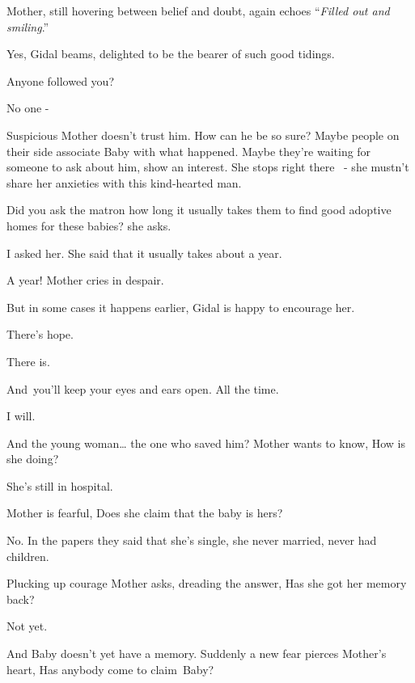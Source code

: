 \documentclass[letterpaper]{article}
\begin{document}
Mother, still hovering between belief and doubt, again{ }echoes ``\textit{Filled
out and smiling}.'' 

{\textquotedbl}Yes,{\textquotedbl} Gidal beams, delighted to be the bearer of such good tidings. 

{\textquotedbl}Anyone followed you?{\textquotedbl} 

{\textquotedbl}No one -{\textquotedbl} 

Suspicious{ }Mother doesn't trust him. How can he be so sure? Maybe people on
their side associate Baby with what happened. Maybe they're waiting for someone to ask about him, show an interest. She
stops right there \ {}- she mustn't share her anxieties with this kind-hearted man. 

{\textquotedbl}Did you ask the matron how long it usually takes them to find good adoptive homes for these
babies?{\textquotedbl} she asks.

{\textquotedbl}I asked her. She said that it usually takes about a year.{\textquotedbl} 

{\textquotedbl}A year!{\textquotedbl} Mother cries in despair. 

{\textquotedbl}But in some cases it happens earlier,{\textquotedbl} Gidal is happy to encourage her. 

{\textquotedbl}There's hope.{\textquotedbl} 

{\textquotedbl}There is.{\textquotedbl} 

{\textquotedbl}And~you'll keep your eyes and ears open. All the time.{\textquotedbl} 

{\textquotedbl}I will.{\textquotedbl} 

{\textquotedbl}And the young woman{\dots} the one who saved him?{\textquotedbl} Mother wants to know, {\textquotedbl}How
is she doing?{\textquotedbl} 

{\textquotedbl}She's still in hospital.{\textquotedbl} 

Mother is fearful, {\textquotedbl}Does she claim{ }that the baby is hers?{\textquotedbl} 

{\textquotedbl}No. In the papers they said that she's single, she never married, never had children.{\textquotedbl} 

Plucking up courage Mother asks, dreading the answer, {\textquotedbl}Has she got her memory back?{\textquotedbl} 

{\textquotedbl}Not yet.{\textquotedbl} 

{\textquotedbl}And Baby doesn't yet have a memory.{\textquotedbl} Suddenly a new fear pierces Mother's heart,
{\textquotedbl}Has anybody come to claim~Baby?{\textquotedbl} 
\end{document}
